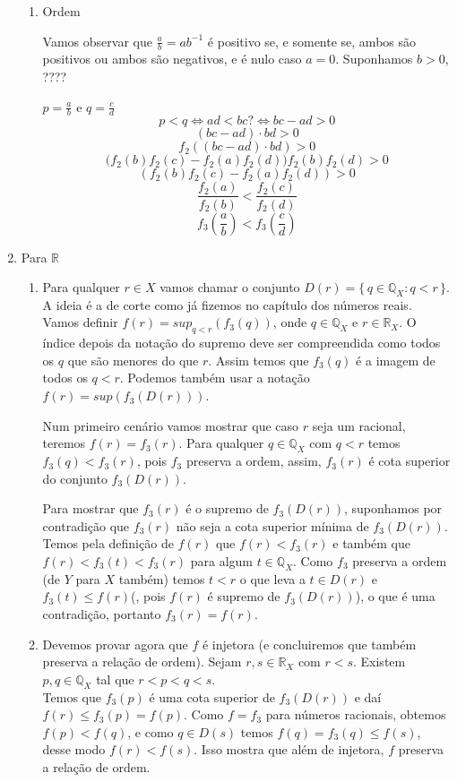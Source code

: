 \documentclass[../main.tex]{subfiles}
\begin{document}
\begin{dem}
\begin{enumerate}
\begin{enumerate}
            \item Ordem

            Vamos observar que $\frac{a}{b} = ab^{-1}$ é positivo se, e somente se, ambos são positivos ou ambos são negativos, e é nulo caso $a=0$.
            Suponhamos $b > 0$, ????

            $p = \frac{a}{b}$ e $q = \frac{c}{d}$
            \[ p < q \iff ad < bc ? \iff bc - ad > 0\]
            \[ (bc-ad) \cdot bd > 0 \]
            \[ f_2((bc-ad) \cdot bd) > 0  \]
            \[ \big( f_2(b)f_2(c) - f_2(a)f_2(d) \big) f_2(b)f_2(d) > 0\]
            \[ ( f_2(b)f_2(c) - f_2(a)f_2(d) ) > 0\]
            \[ \dfrac{f_2(a)}{f_2(b)} < \dfrac{f_2(c)}{f_2(d)} \]
            \[ f_3\left(\frac{a}{b}\right) < f_3\left(\frac{c}{d}\right) \]
        \end{enumerate}
    \item Para $\mathbb{R}$ \\

        \begin{enumerate}
            \item Para qualquer $r \in X$ vamos chamar o conjunto $D(r) = \{\,q \in \mathbb{Q}_X : q < r \,\} $. A ideia é a de corte como já fizemos no capítulo dos números reais.
            Vamos definir $f(r) = sup_{q < r}( f_3(q) )$, onde $q \in \mathbb{Q}_X$ e $r \in \mathbb{R}_X$. O índice depois da notação do supremo deve ser compreendida como todos os $q$ que são menores do que $r$. Assim temos que $f_3(q)$ é a imagem de todos os $q < r$. Podemos também usar a notação $f(r) = sup(f_3(D(r)))$.

            Num primeiro cenário vamos mostrar que caso $r$ seja um racional, teremos $f(r) = f_3(r)$.
            Para qualquer $q \in \mathbb{Q}_X$ com $q < r$ temos $f_3(q) < f_3(r)$, pois $f_3$ preserva a ordem, assim, $f_3(r)$ é cota superior do conjunto $f_3(D(r))$.

            Para mostrar que $f_3(r)$ é o supremo de $f_3(D(r))$, suponhamos por contradição que $f_3(r)$ não seja a cota superior mínima de $f_3(D(r))$. Temos pela definição de $f(r)$ que $f(r) < f_3(r)$ e também que $f(r) < f_3(t) < f_3(r)$ para algum $t \in \mathbb{Q}_X$. Como $f_3$ preserva a ordem (de $Y$ para $X$ também) temos $t < r$ o que leva a 
            $t \in D(r)$ e $f_3(t) \leq f(r)$(, pois $f(r)$ é supremo de $f_3(D(r))$), o que é uma contradição, portanto $f_3(r) = f(r)$.

            \item Devemos provar agora que $f$ é injetora (e concluiremos que também preserva a relação de ordem).
            Sejam $r,s \in \mathbb{R}_X$ com $r < s$. Existem $p,q \in \mathbb{Q}_X$ tal que $r < p < q < s$. \\
            Temos que $f_3(p)$ é uma cota superior de $f_3(D(r))$ e daí $f(r) \leq f_3(p) = f(p)$.
            Como $f=f_3$ para números racionais, obtemos $f(p) < f(q)$, e como $q \in D(s)$ temos $f(q) = f_3(q) \leq f(s)$, desse modo $f(r) < f(s)$. Isso mostra que além de injetora, $f$ preserva a relação de ordem.


\end{enumerate}
\end{enumerate}
\end{dem}
\end{document}
